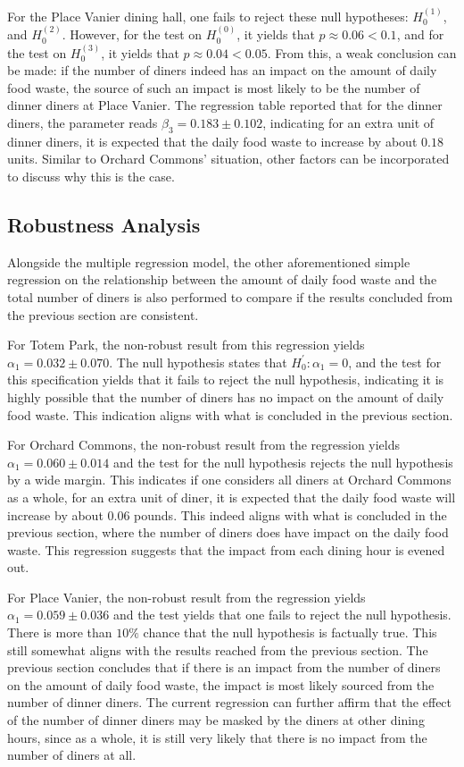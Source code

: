 For the Place Vanier dining hall, one fails to reject these null hypotheses: $H_0^{(1)}$, and $H_0^{(2)}$. However, for the test on $H_0^{(0)}$, it yields that $p \approx 0.06 < 0.1$, and for the test on $H_0^{(3)}$, it yields that $p \approx 0.04 < 0.05$. From this, a weak conclusion can be made: if the number of diners indeed has an impact on the amount of daily food waste, the source of such an impact is most likely to be the number of dinner diners at Place Vanier. The regression table reported that for the dinner diners, the parameter reads $\beta_3 = 0.183 \pm 0.102$, indicating for an extra unit of dinner diners, it is expected that the daily food waste to increase by about $0.18$ units. Similar to Orchard Commons' situation, other factors can be incorporated to discuss why this is the case.

\subsection{Robustness Analysis}
Alongside the multiple regression model, the other aforementioned simple regression on the relationship between the amount of daily food waste and the total number of diners is also performed to compare if the results concluded from the previous section are consistent.

For Totem Park, the non-robust result from this regression yields $\alpha_1 = 0.032 \pm 0.070$. The null hypothesis states that $H_0^{'}: \alpha_1 = 0$, and the test for this specification yields that it fails to reject the null hypothesis, indicating it is highly possible that the number of diners has no impact on the amount of daily food waste. This indication aligns with what is concluded in the previous section.

For Orchard Commons, the non-robust result from the regression yields $\alpha_1 = 0.060 \pm 0.014$ and the test for the null hypothesis rejects the null hypothesis by a wide margin. This indicates if one considers all diners at Orchard Commons as a whole, for an extra unit of diner, it is expected that the daily food waste will increase by about $0.06$ pounds. This indeed aligns with what is concluded in the previous section, where the number of diners does have impact on the daily food waste. This regression suggests that the impact from each dining hour is evened out.

For Place Vanier, the non-robust result from the regression yields $\alpha_1 = 0.059 \pm 0.036$ and the test yields that one fails to reject the null hypothesis. There is more than $10\%$ chance that the null hypothesis is factually true. This still somewhat aligns with the results reached from the previous section. The previous section concludes that if there is an impact from the number of diners on the amount of daily food waste, the impact is most likely sourced from the number of dinner diners. The current regression can further affirm that the effect of the number of dinner diners may be masked by the diners at other dining hours, since as a whole, it is still very likely that there is no impact from the number of diners at all.

